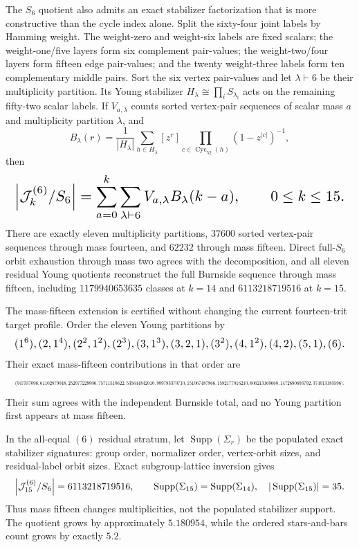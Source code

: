 \documentclass{article}
\newcommand{\fitmath}[1]{\resizebox{0.99\linewidth}{!}{$\displaystyle #1$}}
\begin{document}
The $S_6$ quotient also admits an exact stabilizer factorization that is more
constructive than the cycle index alone. Split the sixty-four joint labels by
Hamming weight. The weight-zero and weight-six labels are fixed scalars; the
weight-one/five layers form six complement pair-values; the weight-two/four
layers form fifteen edge pair-values; and the twenty weight-three labels form
ten complementary middle pairs. Sort the six vertex pair-values and let
$\lambda\vdash6$ be their multiplicity partition. Its Young stabilizer
$H_\lambda\cong\prod_i S_{\lambda_i}$ acts on the remaining fifty-two scalar
labels. If $V_{a,\lambda}$ counts sorted vertex-pair sequences of scalar mass
$a$ and multiplicity partition $\lambda$, and
\[
  B_\lambda(r)=\frac{1}{|H_\lambda|}
    \sum_{h\in H_\lambda}
      [z^r]\prod_{c\in\operatorname{Cyc}_{52}(h)}(1-z^{|c|})^{-1},
\]
then
\begin{equation}
  \fitmath{%
    \left|\mathcal J^{(6)}_k/S_6\right|
      =\sum_{a=0}^{k}\sum_{\lambda\vdash6}
        V_{a,\lambda}B_\lambda(k-a),
    \qquad 0\leq k\leq15.
  }
  \label{eq:optimization-crazy-sextuple-s6-decomposition}
\end{equation}
There are exactly eleven multiplicity partitions, $37600$ sorted vertex-pair
sequences through mass fourteen, and $62232$ through mass fifteen. Direct
full-$S_6$ orbit exhaustion through mass two agrees with the decomposition, and
all eleven residual Young quotients reconstruct the full Burnside sequence
through mass fifteen, including $1179940653635$ classes at $k=14$ and
$6113218719516$ at $k=15$.

The mass-fifteen extension is certified without changing the current
fourteen-trit target profile. Order the eleven Young partitions by
\[
  \fitmath{%
    (1^6),(2,1^4),(2^2,1^2),(2^3),(3,1^3),(3,2,1),(3^2),
    (4,1^2),(4,2),(5,1),(6).
  }
\]
Their exact mass-fifteen contributions in that order are
\[
  \fitmath{%
    (947337096,61102879048,252977228906,75711510622,535644842010,
    999783370710,151067487866,1582177016210,606213169660,
    1472680693792,374913183596).
  }
\]
Their sum agrees with the independent Burnside total, and no Young partition
first appears at mass fifteen.

In the all-equal $(6)$ residual stratum, let $\operatorname{Supp}(\Sigma_r)$
be the populated exact stabilizer signatures: group order, normalizer order,
vertex-orbit sizes, and residual-label orbit sizes. Exact subgroup-lattice
inversion gives
\begin{equation}
  \fitmath{%
    \left|\mathcal J^{(6)}_{15}/S_6\right|=6113218719516,
    \qquad
    \operatorname{Supp}(\Sigma_{15})=\operatorname{Supp}(\Sigma_{14}),
    \quad |\operatorname{Supp}(\Sigma_{15})|=35.
  }
  \label{eq:optimization-crazy-sextuple-s6-mass-fifteen-stability}
\end{equation}
Thus mass fifteen changes multiplicities, not the populated stabilizer support.
The quotient grows by approximately $5.180954$, while the ordered
stars-and-bars count grows by exactly $5.2$.
\end{document}
